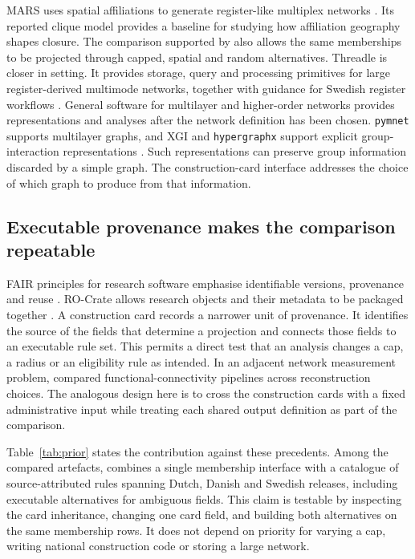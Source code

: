MARS uses spatial affiliations to generate register-like multiplex networks \citep{hamilton2026}. Its reported clique model provides a baseline for studying how affiliation geography shapes closure. The comparison supported by \builtnet{} also allows the same memberships to be projected through capped, spatial and random alternatives. Threadle is closer in setting. It provides storage, query and processing primitives for large register-derived multimode networks, together with guidance for Swedish register workflows \citep{nordlundthreadle2026,nordlund2026}. General software for multilayer and higher-order networks provides representations and analyses after the network definition has been chosen. \texttt{pymnet} supports multilayer graphs, and XGI and \texttt{hypergraphx} support explicit group-interaction representations \citep{nurmi2024,landry2023,lotito2023}. Such representations can preserve group information discarded by a simple graph. The construction-card interface addresses the choice of which graph to produce from that information.

\subsection{Executable provenance makes the comparison repeatable}

FAIR principles for research software emphasise identifiable versions, provenance and reuse \citep{barker2022}. RO-Crate allows research objects and their metadata to be packaged together \citep{soiland2022}. A construction card records a narrower unit of provenance. It identifies the source of the fields that determine a projection and connects those fields to an executable rule set. This permits a direct test that an analysis changes a cap, a radius or an eligibility rule as intended. In an adjacent network measurement problem, \citet{luppi2024} compared functional-connectivity pipelines across reconstruction choices. The analogous design here is to cross the construction cards with a fixed administrative input while treating each shared output definition as part of the comparison.

Table~\ref{tab:prior} states the contribution against these precedents. Among the compared artefacts, \builtnet{} combines a single membership interface with a catalogue of source-attributed rules spanning Dutch, Danish and Swedish releases, including executable alternatives for ambiguous fields. This claim is testable by inspecting the card inheritance, changing one card field, and building both alternatives on the same membership rows. It does not depend on priority for varying a cap, writing national construction code or storing a large network.

\FloatBarrier
